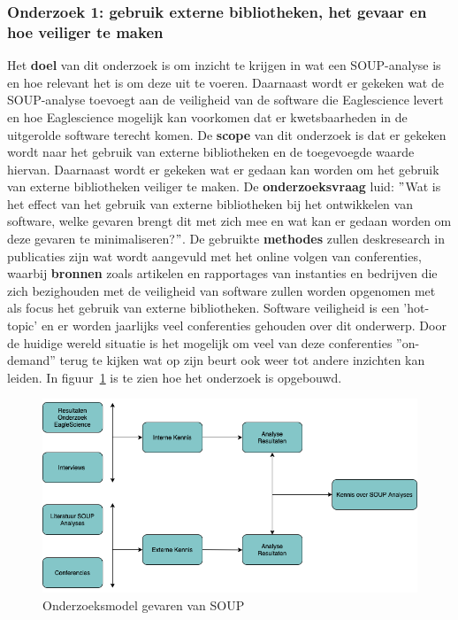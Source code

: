 \subsubsection{Onderzoek 1: gebruik externe bibliotheken, het gevaar en hoe veiliger te maken}
Het \textbf{doel} van dit onderzoek is om inzicht te krijgen in wat een SOUP-analyse is en hoe relevant het is om deze uit te voeren. Daarnaast wordt er gekeken wat de SOUP-analyse toevoegt aan de veiligheid van de software die Eaglescience levert en hoe Eaglescience mogelijk kan voorkomen dat er kwetsbaarheden in de uitgerolde software terecht komen.
De \textbf{scope} van dit onderzoek is dat er gekeken wordt naar het gebruik van externe bibliotheken en de toegevoegde waarde hiervan. Daarnaast wordt er gekeken wat er gedaan kan worden om het gebruik van externe bibliotheken veiliger te maken.
De \textbf{onderzoeksvraag} luid: $"$Wat is het effect van het gebruik van externe bibliotheken bij het ontwikkelen van software, welke gevaren brengt dit met zich mee en wat kan er gedaan worden om deze gevaren te minimaliseren?$"$.
De gebruikte \textbf{methodes} zullen deskresearch in publicaties zijn wat wordt aangevuld met het online volgen van conferenties, waarbij \textbf{bronnen} zoals artikelen en rapportages van instanties en bedrijven die zich bezighouden met de veiligheid van software zullen worden opgenomen met als focus het gebruik van externe bibliotheken. Software veiligheid is een 'hot-topic' en er worden jaarlijks veel conferenties gehouden over dit onderwerp. Door de huidige wereld situatie is het mogelijk om veel van deze conferenties  ''on-demand'' terug te kijken wat op zijn beurt ook weer tot andere inzichten kan leiden. In figuur~\ref{fig:OnderzoeksModelNoodZaakSOUP} is te zien hoe het onderzoek is opgebouwd.
\begin{figure}[htbp]
    \myfloatalign
    \includegraphics[width=12cm]{gfx/OnderzoeksmodelSOUP}
    \caption{Onderzoeksmodel gevaren van SOUP}
    \label{fig:OnderzoeksModelNoodZaakSOUP}
\end{figure}



